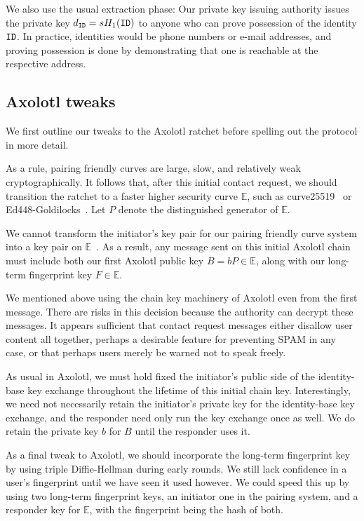 \documentclass[twoside,letterpaper]{sig-alternate}
\begin{document}
We also use the usual extraction phase:
Our private key issuing authority
issues the private key $d_{\mathtt{ID}} = s H_1(\mathtt{ID})$ to anyone who
can prove possession of the identity $\mathtt{ID}$.  In practice,
identities would be phone numbers or e-mail addresses,
and proving possession is done by demonstrating that
one is reachable at the respective address.

\subsection{Axolotl tweaks} %

We first outline our tweaks to the Axolotl ratchet before
 spelling out the protocol in more detail.

As a rule, pairing friendly curves are large, slow, and relatively
 weak cryptographically.
It follows that, after this initial contact request, we should
transition the ratchet to a faster higher security curve $\mathbb{E}$,
such as curve25519~\cite{DJB-Curve25519}
 or Ed448-Goldilocks~\cite{Ed448-Goldilocks}.
Let $P$ denote the distinguished generator of $\mathbb{E}$.

We cannot transform the initiator's key pair for
our pairing friendly curve system
into a key pair on $\mathbb{E}$~\cite{??no_homomorphism??}.
As a result, any message sent on this initial Axolotl chain must include
both our first Axolotl public key $B = b P \in \mathbb{E}$, along with
our long-term fingerprint key $F \in \mathbb{E}$.

We mentioned above using the chain key machinery of Axolotl even from
the first message.  There are risks in this decision because the
authority can decrypt these messages.  It appears sufficient that
contact request messages either disallow user content all together,
perhaps a desirable feature for preventing SPAM in any case, or that
perhaps users merely be warned not to speak freely.

As usual in Axolotl, we must hold fixed the initiator's public side of
the identity-base key exchange throughout the lifetime of this initial
chain key.  Interestingly, we need not necessarily retain the
initiator's private key for the identity-base key exchange, and
 the responder need only run the key exchange once as well.
We do retain the private key $b$ for $B$ until the responder uses it.

As a final tweak to Axolotl, we should incorporate the long-term
fingerprint key by using triple Diffie-Hellman during early rounds.
We still lack confidence in a user's fingerprint until
we have seen it used however.
We could speed this up by using two long-term fingerprint keys,
an initiator one in the pairing system, and
 a responder key for $\mathbb{E}$,
with the fingerprint being the hash of both.
\end{document}
